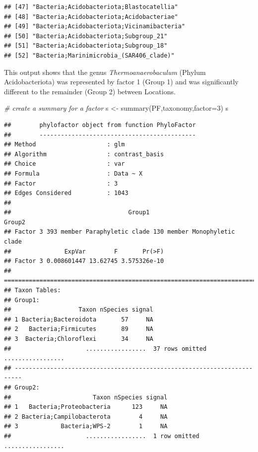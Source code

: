 \documentclass[
]{book}
\newenvironment{Shaded}{\begin{snugshade}}{\end{snugshade}}
\newcommand{\AttributeTok}[1]{\textcolor[rgb]{0.77,0.63,0.00}{#1}}
\newcommand{\CommentTok}[1]{\textcolor[rgb]{0.56,0.35,0.01}{\textit{#1}}}
\newcommand{\DecValTok}[1]{\textcolor[rgb]{0.00,0.00,0.81}{#1}}
\newcommand{\FunctionTok}[1]{\textcolor[rgb]{0.00,0.00,0.00}{#1}}
\newcommand{\NormalTok}[1]{#1}
\newcommand{\OtherTok}[1]{\textcolor[rgb]{0.56,0.35,0.01}{#1}}
\begin{document}
\begin{verbatim}
## [47] "Bacteria;Acidobacteriota;Blastocatellia"                                                              
## [48] "Bacteria;Acidobacteriota;Acidobacteriae"                                                              
## [49] "Bacteria;Acidobacteriota;Vicinamibacteria"                                                            
## [50] "Bacteria;Acidobacteriota;Subgroup_21"                                                                 
## [51] "Bacteria;Acidobacteriota;Subgroup_18"                                                                 
## [52] "Bacteria;Marinimicrobia_(SAR406_clade)"
\end{verbatim}

This output shows that the genus \emph{Thermoanaerobaculum} (Phylum Acidobacteriota) was represented by factor 1 (Group 1) and was significantly different to the remainder (Group 2) between Locations.

\begin{Shaded}
\begin{Highlighting}[]
\CommentTok{\# create a summary for a factor}
\NormalTok{s }\OtherTok{\textless{}{-}} \FunctionTok{summary}\NormalTok{(PF,taxonomy,}\AttributeTok{factor=}\DecValTok{3}\NormalTok{)}
\NormalTok{s}
\end{Highlighting}
\end{Shaded}

\begin{verbatim}
##        phylofactor object from function PhyloFactor
##        --------------------------------------------
## Method                    : glm
## Algorithm                 : contrast_basis
## Choice                    : var
## Formula                   : Data ~ X
## Factor                    : 3
## Edges Considered          : 1043
## 
##                                 Group1                        Group2
## Factor 3 393 member Paraphyletic clade 130 member Monophyletic clade
##               ExpVar        F       Pr(>F)
## Factor 3 0.008601447 13.62745 3.575326e-10
## ========================================================================
## Taxon Tables:
## Group1:
##                   Taxon nSpecies signal
## 1 Bacteria;Bacteroidota       57     NA
## 2   Bacteria;Firmicutes       89     NA
## 3  Bacteria;Chloroflexi       34     NA
##                     .................  37 rows omitted .................
## ------------------------------------------------------------------------
## Group2:
##                       Taxon nSpecies signal
## 1   Bacteria;Proteobacteria      123     NA
## 2 Bacteria;Campilobacterota        4     NA
## 3            Bacteria;WPS-2        1     NA
##                     .................  1 row omitted .................
\end{verbatim}
\end{document}
